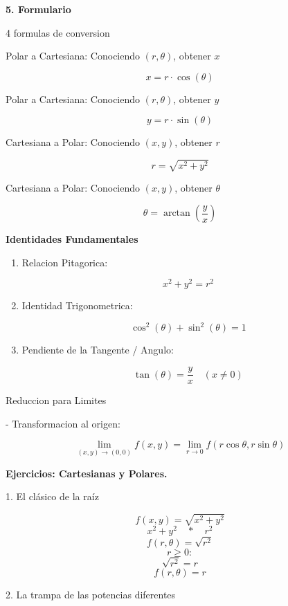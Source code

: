 \documentclass{article}
\begin{document}
\begin{justfy}
\vspace{0.2cm}
\small \textbf {5. Formulario}

\small {4 formulas de conversion}

\vspace{0.2cm}
\small {Polar a Cartesiana: Conociendo $(r,\theta)$, obtener $x$}

\[x=r\cdot\cos(\theta)\]

\small {Polar a Cartesiana: Conociendo $(r,\theta)$, obtener $y$}

\[y=r\cdot\sin(\theta)\]

\small {Cartesiana a Polar: Conociendo $(x,y)$, obtener $r$}

\[r=\sqrt{x^2+y^2}\]

\small {Cartesiana a Polar: Conociendo $(x,y)$, obtener $\theta$}

\[\theta=\arctan\left(\frac{y}{x}\right)\]

\small \textbf{Identidades Fundamentales}

\begin{enumerate}

\item Relacion Pitagorica:

\[x^2+y^2=r^2\]

\item Identidad Trigonometrica:

\[\cos^2(\theta)+\sin^2(\theta)=1\]

\item Pendiente de la Tangente / Angulo:

\[\tan(\theta)=\frac{y}{x}\quad (x\neq 0)\]

\end{enumerate}

\sall \textbf{}{Reduccion para Limites}

\vspace{0.1cm}
\small {- Transformacion al origen:}

\[\lim_{(x,y)\to(0,0)} f(x,y)=\lim_{r\to 0} f(r\cos\theta,r\sin\theta)\]

\newpage

\small \textbf{Ejercicios: Cartesianas y Polares.}

\vspace{0.1cm}
\small {1. El clásico de la raíz}

\[f(x,y)=\sqrt{x^2+y^2}\]
\[x^2+y^2 \quad*\quad r^2\]
\[f(r,\theta)=\sqrt{r^2}\]
\[r\geq 0:\]
\[\sqrt{r^2}=r\]
\[\boxed{f(r,\theta)=r}\]

\vspace{0.1cm}
\small {2. La trampa de las potencias diferentes}


\end{justfy}
\end{document}
